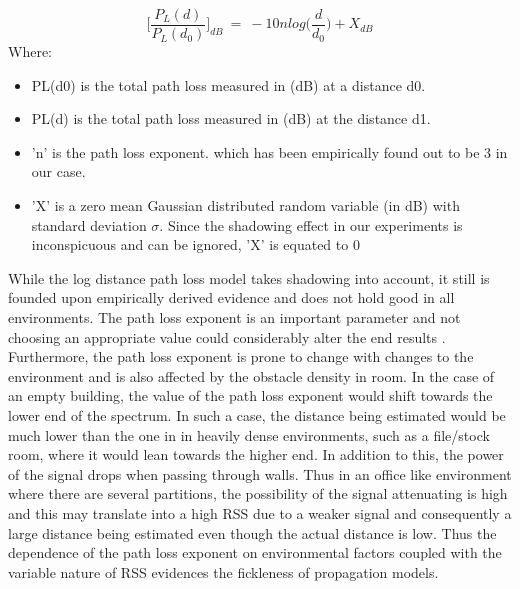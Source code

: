 \documentclass[twocolumn, 11pt]{IEEEtran}
\begin{document}
\begin{equation}
\Bigg[\frac{P_{L}(d)}{P_{L}(d_{0})}\Bigg]_{dB}  ~=~ -10n log\Bigg(\frac{d}{d_{0}}\Bigg) + X_{dB}
\label{pathlosseqn}
\end{equation}
Where:

\begin{itemize}
 \item PL(d0) is the total path loss measured in (dB) at a distance d0.

\item PL(d) is the total path loss measured in (dB) at the distance d1.

\item 'n' is the path loss exponent. which has been empirically found out to be 3 in our case. 

\item 'X' is a zero mean Gaussian distributed random variable (in dB) with standard deviation \( \sigma \). Since the shadowing effect in our experiments is inconspicuous and can be ignored, 'X' is equated to 0
 
\end{itemize}

While the log distance path loss model takes shadowing into account, it still is founded upon empirically derived evidence and does not hold good in all environments. The path loss exponent is an important parameter and not choosing an appropriate value could considerably alter the end results \cite{srinivasa2009path}. Furthermore, the path loss exponent is prone to change with changes to the environment and is also affected by the obstacle density in room. In the case of an empty building, the value of the path loss exponent would shift towards the lower end of the spectrum. In such a case, the distance being estimated would be much lower than the one in in heavily dense environments, such as a file/stock room, where it would lean towards the higher end. In addition to this, the power of the signal drops when passing through walls. Thus in an office like environment where there are several partitions, the possibility of the signal attenuating is high and this may translate into a high RSS due to a weaker signal and consequently a large distance being estimated even though the actual distance is low. Thus the dependence of the path loss exponent on environmental factors coupled with the variable nature of RSS evidences the fickleness of propagation models. 
\end{document}
